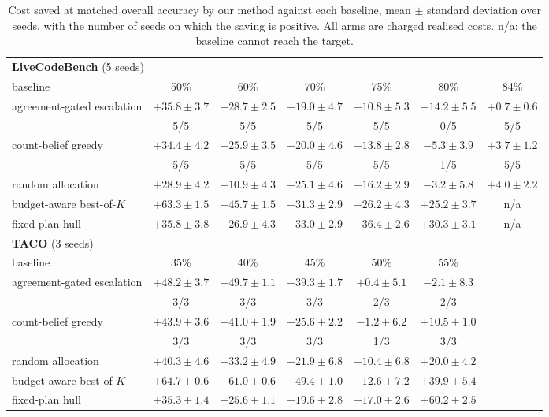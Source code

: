 \documentclass[10pt]{article} %
\begin{document}
\begin{table}[t]
\centering
\small
\caption{Cost saved at matched overall accuracy by our method against each baseline, mean
$\pm$ standard deviation over seeds, with the number of seeds on which the saving is positive.
All arms are charged realised costs.  n/a: the baseline cannot reach the target.}
\label{tab:baselines}
\begin{tabular}{lcccccc}
\toprule
\multicolumn{7}{l}{\textbf{LiveCodeBench} (5 seeds)} \\
baseline & 50\% & 60\% & 70\% & 75\% & 80\% & 84\% \\
\midrule
agreement-gated escalation & $+35.8\pm3.7$ & $+28.7\pm2.5$ & $+19.0\pm4.7$ & $+10.8\pm5.3$ & $-14.2\pm5.5$ & $+0.7\pm0.6$ \\
 & 5/5 & 5/5 & 5/5 & 5/5 & 0/5 & 5/5 \\
count-belief greedy \citep{chen2026ror} & $+34.4\pm4.2$ & $+25.9\pm3.5$ & $+20.0\pm4.6$ & $+13.8\pm2.8$ & $-5.3\pm3.9$ & $+3.7\pm1.2$ \\
 & 5/5 & 5/5 & 5/5 & 5/5 & 1/5 & 5/5 \\
random allocation & $+28.9\pm4.2$ & $+10.9\pm4.3$ & $+25.1\pm4.6$ & $+16.2\pm2.9$ & $-3.2\pm5.8$ & $+4.0\pm2.2$ \\
budget-aware best-of-$K$ & $+63.3\pm1.5$ & $+45.7\pm1.5$ & $+31.3\pm2.9$ & $+26.2\pm4.3$ & $+25.2\pm3.7$ & n/a \\
fixed-plan hull & $+35.8\pm3.8$ & $+26.9\pm4.3$ & $+33.0\pm2.9$ & $+36.4\pm2.6$ & $+30.3\pm3.1$ & n/a \\
\midrule
\multicolumn{7}{l}{\textbf{TACO} (3 seeds)} \\
baseline & 35\% & 40\% & 45\% & 50\% & 55\% & \\
\midrule
agreement-gated escalation & $+48.2\pm3.7$ & $+49.7\pm1.1$ & $+39.3\pm1.7$ & $+0.4\pm5.1$ & $-2.1\pm8.3$ & \\
 & 3/3 & 3/3 & 3/3 & 2/3 & 2/3 & \\
count-belief greedy \citep{chen2026ror} & $+43.9\pm3.6$ & $+41.0\pm1.9$ & $+25.6\pm2.2$ & $-1.2\pm6.2$ & $+10.5\pm1.0$ & \\
 & 3/3 & 3/3 & 3/3 & 1/3 & 3/3 & \\
random allocation & $+40.3\pm4.6$ & $+33.2\pm4.9$ & $+21.9\pm6.8$ & $-10.4\pm6.8$ & $+20.0\pm4.2$ & \\
budget-aware best-of-$K$ & $+64.7\pm0.6$ & $+61.0\pm0.6$ & $+49.4\pm1.0$ & $+12.6\pm7.2$ & $+39.9\pm5.4$ & \\
fixed-plan hull & $+35.3\pm1.4$ & $+25.6\pm1.1$ & $+19.6\pm2.8$ & $+17.0\pm2.6$ & $+60.2\pm2.5$ & \\
\bottomrule
\end{tabular}
\end{table}
\end{document}
